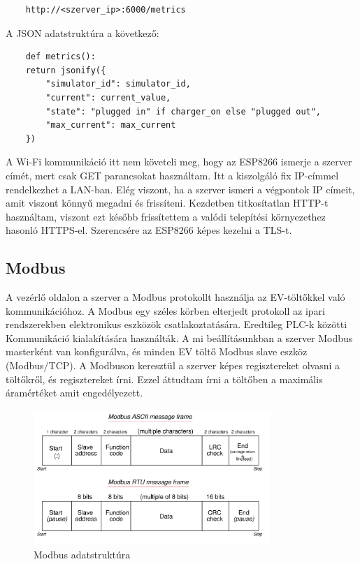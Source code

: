 \begin{lstlisting}
    http://<szerver_ip>:6000/metrics
\end{lstlisting} 
A JSON adatstruktúra a következő:

\begin{lstlisting}
    def metrics():
    return jsonify({
        "simulator_id": simulator_id,
        "current": current_value,
        "state": "plugged in" if charger_on else "plugged out",
        "max_current": max_current
    })
\end{lstlisting}

A Wi-Fi kommunikáció itt nem követeli meg, hogy az ESP8266 ismerje a szerver címét, mert csak GET parancsokat
használtam. Itt a kiszolgáló fix IP-címmel rendelkezhet a LAN-ban. Elég viszont, ha a szerver ismeri a végpontok IP címeit,
amit viszont könnyű megadni és frissíteni.
Kezdetben titkosítatlan HTTP-t használtam, viszont ezt később frissítettem a valódi telepítési környezethez hasonló 
HTTPS-el. Szerencsére az ESP8266 képes kezelni a TLS-t.

\subsection{Modbus}

A vezérlő oldalon a szerver a Modbus protokollt használja az EV-töltőkkel való kommunikációhoz. 
A Modbus egy széles körben elterjedt protokoll az ipari rendszerekben elektronikus eszközök csatlakoztatására. 
Eredtileg PLC-k közötti Kommunikáció kialakítására használták.
A mi beállításunkban a szerver Modbus masterként van konfigurálva, 
és minden EV töltő Modbus slave eszköz (Modbus/TCP). A Modbuson keresztül a szerver képes regisztereket olvasni a 
töltőkről, és regisztereket írni. Ezzel áttudtam írni a töltőben a maximális áramértéket amit engedélyezett. 
\cite{mcuoneclipse:evcharger}

\begin{figure}[!ht]
    \centering
    \includegraphics[width=0.8\textwidth, keepaspectratio]{figures/Modbus_Frame.png}
    \caption{Modbus adatstruktúra \cite{instrumentationtools:modbus}} 
\end{figure}

